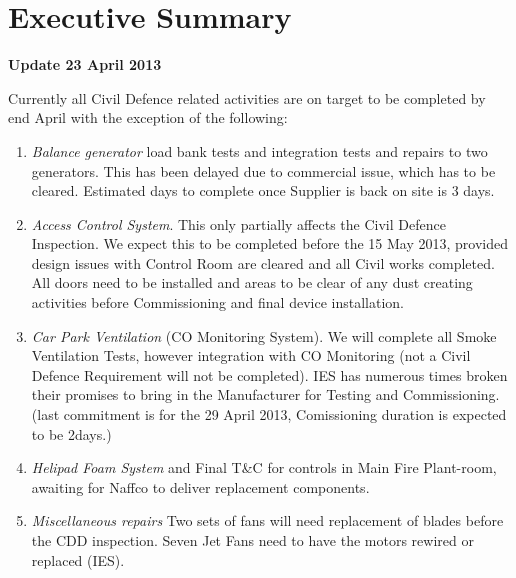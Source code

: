 

\makeatletter
\newenvironment{update}{\quotation}{\endquotation}
\makeatother
\chapter{Executive Summary}

\begin{update}
\centerline{\textbf{Update 23 April 2013}}

\noindent Currently all Civil Defence related activities are on target  to be completed by end April  with the exception of the following:

\begin{enumerate}
\item  \textit{Balance generator} load bank tests and integration tests and repairs to two generators. This has been delayed due to commercial issue, which has to be cleared. Estimated days to complete once Supplier is back on site is 3 days.

\item \textit{Access Control System}. This only partially affects the Civil Defence Inspection. We expect this to be completed before the 15 May 2013, provided design issues with Control Room are cleared and all Civil works completed. All doors need to be installed and areas to be clear of any dust creating activities before Commissioning and final device installation.

\item \textit{Car Park Ventilation} (CO Monitoring System). We will complete all Smoke Ventilation Tests, however integration with CO Monitoring (not a Civil Defence Requirement will not be completed). IES has numerous times broken their promises to bring in the Manufacturer for Testing and Commissioning. (last commitment is for the 29 April 2013, Comissioning duration is expected to be 2days.)

\item \textit{Helipad Foam System} and Final T\&C for controls in Main Fire Plant-room, awaiting for Naffco to deliver replacement components.

\item \textit{Miscellaneous repairs} Two sets of fans will need replacement of blades before the CDD inspection. Seven Jet Fans need to have the motors rewired or replaced (IES).


\end{enumerate}
\end{update}
